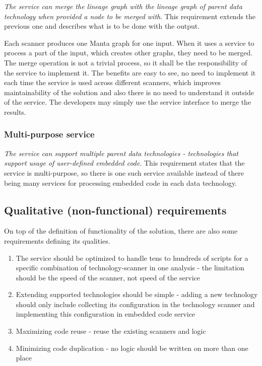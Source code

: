 \textit{The service can merge the lineage graph with the lineage graph of parent data technology when provided a node to be merged with}. This requirement extends the previous one and describes what is to be done with the output.
\par
Each scanner produces one Manta graph for one input. When it uses a service to process a part of the input, which creates other graphs, they need to be merged. The merge operation is not a trivial process, so it shall be the responsibility of the service to implement it. The benefits are easy to see, no need to implement it each time the service is used across different scanners, which improves maintainability of the solution and also there is no need to understand it outside of the service. The developers may simply use the service interface to merge the results.

\subsubsection{Multi-purpose service}

\textit{The service can support multiple parent data technologies - technologies that support usage of user-defined embedded code}. This requirement states that the service is multi-purpose, so there is one such service available instead of there being many services for processing embedded code in each data technology.

\subsection{Qualitative (non-functional) requirements}

On top of the definition of functionality of the solution, there are also some requirements defining its qualities.

\begin{enumerate}
    \item The service should be optimized to handle tens to hundreds of scripts for a specific combination of technology-scanner in one analysis - the limitation should be the speed of the scanner, not speed of the service
    \item Extending supported technologies should be simple - adding a new technology should only include collecting its configuration in the technology scanner and implementing this configuration in embedded code service
    \item Maximizing code reuse - reuse the existing scanners and logic
    \item Minimizing code duplication - no logic should be written on more than one place
\end{enumerate}



